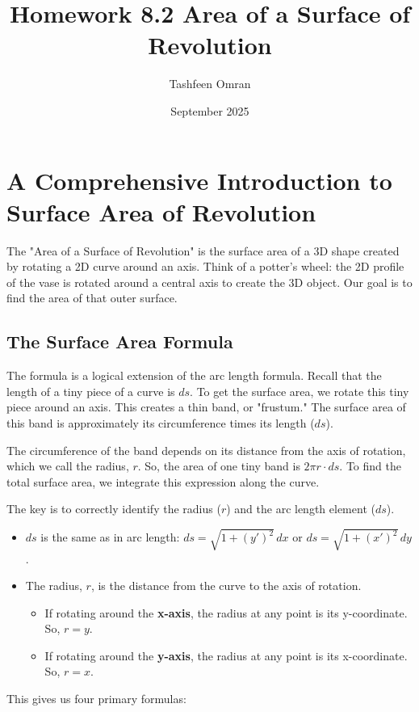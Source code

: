 \documentclass{article}
\title{Homework 8.2 Area of a Surface of Revolution}
\author{Tashfeen Omran}
\date{September 2025}
\begin{document}
\maketitle

\section{A Comprehensive Introduction to Surface Area of Revolution}

The "Area of a Surface of Revolution" is the surface area of a 3D shape created by rotating a 2D curve around an axis. Think of a potter's wheel: the 2D profile of the vase is rotated around a central axis to create the 3D object. Our goal is to find the area of that outer surface.

\subsection*{The Surface Area Formula}
The formula is a logical extension of the arc length formula. Recall that the length of a tiny piece of a curve is $ds$. To get the surface area, we rotate this tiny piece around an axis. This creates a thin band, or "frustum." The surface area of this band is approximately its circumference times its length ($ds$).

The circumference of the band depends on its distance from the axis of rotation, which we call the radius, $r$. So, the area of one tiny band is $2\pi r \cdot ds$. To find the total surface area, we integrate this expression along the curve.

The key is to correctly identify the radius ($r$) and the arc length element ($ds$).
\begin{itemize}
    \item $ds$ is the same as in arc length: $ds = \sqrt{1 + (y')^2} \,dx$ or $ds = \sqrt{1 + (x')^2} \,dy$.
    \item The radius, $r$, is the distance from the curve to the axis of rotation.
        \begin{itemize}
            \item If rotating around the \textbf{x-axis}, the radius at any point is its y-coordinate. So, $r=y$.
            \item If rotating around the \textbf{y-axis}, the radius at any point is its x-coordinate. So, $r=x$.
        \end{itemize}
\end{itemize}

This gives us four primary formulas:
\end{document}

